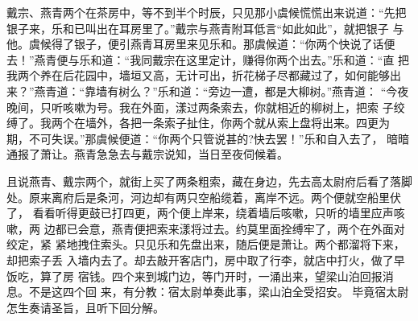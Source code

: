 戴宗、燕青两个在茶房中，等不到半个时辰，只见那小虞候慌慌出来说道：“先把
银子来，乐和已叫出在耳房里了。”戴宗与燕青附耳低言“如此如此”，就把银子
与他。虞候得了银子，便引燕青耳房里来见乐和。那虞候道：“你两个快说了话便
去！”燕青便与乐和道：“我同戴宗在这里定计，赚得你两个出去。”乐和道：“直
把我两个养在后花园中，墙垣又高，无计可出，折花梯子尽都藏过了，如何能够出
来？”燕青道：“靠墙有树么？”乐和道：“旁边一遭，都是大柳树。”燕青道：
“今夜晚间，只听咳嗽为号。我在外面，漾过两条索去，你就相近的柳树上，把索
子绞缚了。我两个在墙外，各把一条索子扯住，你两个就从索上盘将出来。四更为
期，不可失误。”那虞候便道：“你两个只管说甚的?快去罢！”乐和自入去了，
暗暗通报了萧让。燕青急急去与戴宗说知，当日至夜伺候着。

且说燕青、戴宗两个，就街上买了两条粗索，藏在身边，先去高太尉府后看了落脚
处。原来离府后是条河，河边却有两只空船缆着，离岸不远。两个便就空船里伏了，
看看听得更鼓已打四更，两个便上岸来，绕着墙后咳嗽，只听的墙里应声咳嗽，两
边都已会意，燕青便把索来漾将过去。约莫里面拴缚牢了，两个在外面对绞定，紧
紧地拽住索头。只见乐和先盘出来，随后便是萧让。两个都溜将下来，却把索子丢
入墙内去了。却去敲开客店门，房中取了行李，就店中打火，做了早饭吃，算了房
宿钱。四个来到城门边，等门开时，一涌出来，望梁山泊回报消息。不是这四个回
来，有分教：宿太尉单奏此事，梁山泊全受招安。
毕竟宿太尉怎生奏请圣旨，且听下回分解。